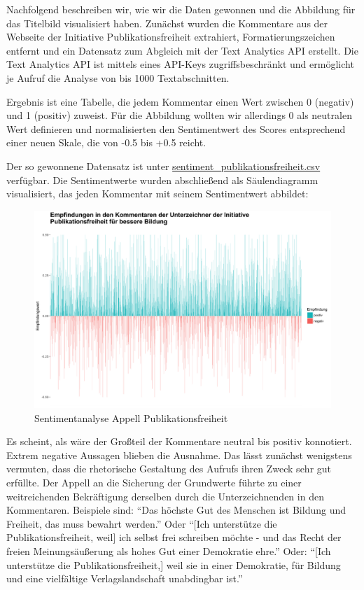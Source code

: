 \documentclass[a4paper,
fontsize=11pt,
oneside,
numbers=noperiodatend,
parskip=half-,
bibliography=totoc,
final
]{scrartcl}
\begin{document}
Nachfolgend beschreiben wir, wie wir die Daten gewonnen und die
Abbildung für das Titelbild visualisiert haben. Zunächst wurden die
Kommentare aus der Webseite der Initiative Publikationsfreiheit
extrahiert, Formatierungszeichen entfernt und ein Datensatz zum Abgleich
mit der Text Analytics API erstellt. Die Text Analytics API ist mittels
eines API-Keys zugriffsbeschränkt und ermöglicht je Aufruf die Analyse
von bis 1000 Textabschnitten.

Ergebnis ist eine Tabelle, die jedem Kommentar einen Wert zwischen 0
(negativ) und 1 (positiv) zuweist. Für die Abbildung wollten wir
allerdings 0 als neutralen Wert definieren und normalisierten den
Sentimentwert des Scores entsprechend einer neuen Skale, die von -0.5
bis +0.5 reicht.

Der so gewonnene Datensatz ist unter
\url{sentiment_publikationsfreiheit.csv} verfügbar. Die Sentimentwerte
wurden abschließend als Säulendiagramm visualisiert, das jeden Kommentar
mit seinem Sentimentwert abbildet:

\begin{figure}
\centering
\includegraphics{img/sentiment_abbbildung.png}
\caption{Sentimentanalyse Appell Publikationsfreiheit}
\end{figure}

Es scheint, als wäre der Großteil der Kommentare neutral bis positiv
konnotiert. Extrem negative Aussagen blieben die Ausnahme. Das lässt
zunächst wenigstens vermuten, dass die rhetorische Gestaltung des
Aufrufs ihren Zweck sehr gut erfüllte. Der Appell an die Sicherung der
Grundwerte führte zu einer weitreichenden Bekräftigung derselben durch
die Unterzeichnenden in den Kommentaren. Beispiele sind: \enquote{Das
höchste Gut des Menschen ist Bildung und Freiheit, das muss bewahrt
werden.} Oder \enquote{{[}Ich unterstütze die Publikationsfreiheit,
weil{]} ich selbst frei schreiben möchte - und das Recht der freien
Meinungsäußerung als hohes Gut einer Demokratie ehre.} Oder:
\enquote{{[}Ich unterstütze die Publikationsfreiheit,{]} weil sie in
einer Demokratie, für Bildung und eine vielfältige Verlagslandschaft
unabdingbar ist.}
\end{document}
